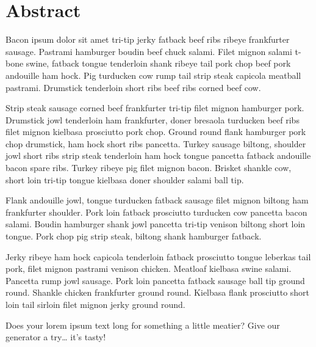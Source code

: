 \section*{Abstract}

Bacon ipsum dolor sit amet tri-tip jerky fatback beef ribs ribeye frankfurter sausage. Pastrami hamburger boudin beef chuck salami. Filet mignon salami t-bone swine, fatback tongue tenderloin shank ribeye tail pork chop beef pork andouille ham hock. Pig turducken cow rump tail strip steak capicola meatball pastrami. Drumstick tenderloin short ribs beef ribs corned beef cow.

Strip steak sausage corned beef frankfurter tri-tip filet mignon hamburger pork. Drumstick jowl tenderloin ham frankfurter, doner bresaola turducken beef ribs filet mignon kielbasa prosciutto pork chop. Ground round flank hamburger pork chop drumstick, ham hock short ribs pancetta. Turkey sausage biltong, shoulder jowl short ribs strip steak tenderloin ham hock tongue pancetta fatback andouille bacon spare ribs. Turkey ribeye pig filet mignon bacon. Brisket shankle cow, short loin tri-tip tongue kielbasa doner shoulder salami ball tip.

Flank andouille jowl, tongue turducken fatback sausage filet mignon biltong ham frankfurter shoulder. Pork loin fatback prosciutto turducken cow pancetta bacon salami. Boudin hamburger shank jowl pancetta tri-tip venison biltong short loin tongue. Pork chop pig strip steak, biltong shank hamburger fatback.

Jerky ribeye ham hock capicola tenderloin fatback prosciutto tongue leberkas tail pork, filet mignon pastrami venison chicken. Meatloaf kielbasa swine salami. Pancetta rump jowl sausage. Pork loin pancetta fatback sausage ball tip ground round. Shankle chicken frankfurter ground round. Kielbasa flank prosciutto short loin tail sirloin filet mignon jerky ground round.

Does your lorem ipsum text long for something a little meatier? Give our generator a try… it’s tasty!
